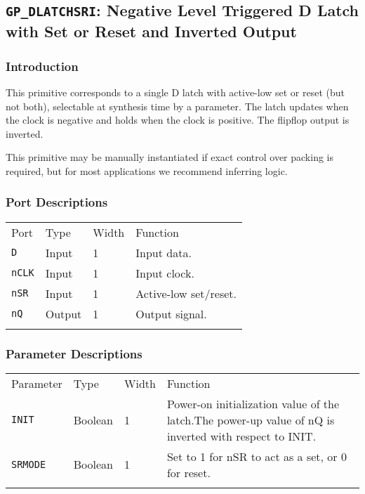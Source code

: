\documentclass[11pt]{article}
\newcommand{\tokenstyle}[1]{\texttt{#1}}
\newcommand{\whenstyle}[1]{{\fontseries{sb}\selectfont#1}}
\newcommand{\thinhline}{\Xhline{1\arrayrulewidth}}
\newcommand{\thickhline}{\Xhline{2.5\arrayrulewidth}}
\begin{document}

\pagebreak
\subsection{\tokenstyle{GP\_DLATCHSRI}: Negative Level Triggered D Latch with Set or Reset and Inverted Output}
\label{gp-latchsri}

\subsubsection{Introduction}
This primitive corresponds to a single D latch with active-low set or reset (but not both), selectable at synthesis time by 
a parameter. The latch updates when the clock is negative and holds when the clock is positive. The flipflop output is 
inverted.

This primitive may be manually instantiated if exact control over packing is required, but for most applications we
recommend inferring logic.

\subsubsection{Port Descriptions}

\begin{tabularx}{\textwidth}{lllX}
\thinhline
\whenstyle{Port} & \whenstyle{Type} & \whenstyle{Width} & \whenstyle{Function} \\
\thickhline
\tokenstyle{D} & Input & 1 & Input data. \\
\thinhline
\tokenstyle{nCLK} & Input & 1 & Input clock. \\
\thinhline
\tokenstyle{nSR} & Input & 1 & Active-low set/reset. \\
\thinhline
\tokenstyle{nQ} & Output & 1 & Output signal. \\
\thinhline
\end{tabularx}

\subsubsection{Parameter Descriptions}

\begin{tabularx}{\textwidth}{lllX}
\thinhline
\whenstyle{Parameter} & \whenstyle{Type} & \whenstyle{Width} & \whenstyle{Function} \\
\thickhline
\tokenstyle{INIT} & Boolean & 1 & Power-on initialization value of the latch.\newline The power-up value of nQ is
inverted with respect to INIT.\\
\thinhline
\tokenstyle{SRMODE} & Boolean & 1 & Set to 1 for nSR to act as a set, or 0 for reset. \\
\thinhline
\end{tabularx}
\end{document}
